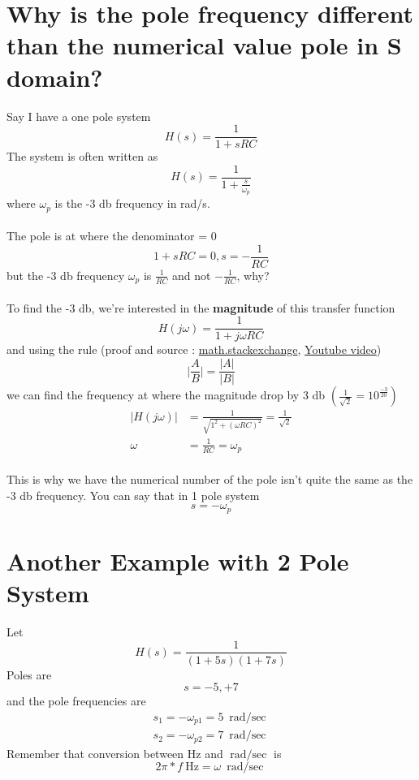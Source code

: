 \documentclass{article}
\begin{document}
	\section{Why is the pole frequency different than the numerical value pole in S domain?}
	Say I have a one pole system
	\[H(s)=\frac{1}{1+sRC}\]
	The system is often written as
	\[H(s)=\frac{1}{1+\frac{s}{\omega_p}}\]
	where $\omega_p$ is the -3 \si{\decibel} frequency in \si{\radian/\second}.\\\\
	The pole is at where the denominator = 0
	\[1+sRC=0, s=-\frac{1}{RC}\]
	but the -3 \si{\decibel} frequency $\omega_p$ is $\frac{1}{RC}$ and not $-\frac{1}{RC}$, why?\\\\
	To find the -3 \si{\decibel}, we're interested in the \textbf{magnitude} of this transfer function
	\[H(j\omega)=\frac{1}{1+j\omega RC}\]
	and using the rule (proof and source : \href{URLhttps://math.stackexchange.com/questions/766841/is-this-a-valid-method-of-finding-magnitude-of-complex-fraction}{math.stackexchange}, \href{https://youtu.be/8NquqDYpqPw?feature=shared&t=237}{Youtube video})
	\[\big|\frac{A}{B}\big|=\frac{\big|A\big|}{\big|B\big|}\]
	we can find the frequency at where the magnitude drop by 3 \si{\decibel} $\left(\frac{1}{\sqrt{2}}=10^\frac{-3}{20}\right)$
	\begin{align*}
		\big|H(j\omega)\big|&=\frac{1}{\sqrt{1^2+\left(\omega RC\right)^2}}=\frac{1}{\sqrt{2}}\\
		\omega&=\frac{1}{RC}=\omega_p
	\end{align*}
	\\ This is why we have the numerical number of the pole isn't quite the same as the -3 \si{\decibel} frequency. You can say that in 1 pole system
	\[s=-\omega_p\]
	
	\section{Another Example with 2 Pole System}
	Let
	\[H(s)=\frac{1}{(1+5s)(1+7s)}\]
	Poles are
	\[s=-5, +7\]
	and the pole frequencies are 
	\begin{align*}
		s_1=-\omega_{p1}=5\ \si{\radian\per\sec}\\
		s_2=-\omega_{p2}=7\ \si{\radian\per\sec}
	\end{align*}
	Remember that conversion between Hz and $\si{\radian\per\sec}$ is
	\[2\pi*f\ \si{\hertz} = \omega\ \si{\radian\per\sec}\]
\end{document}
